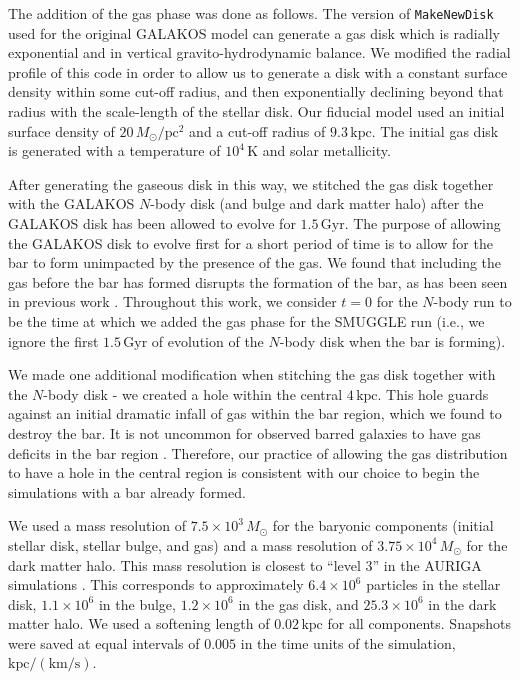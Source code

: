 \documentclass[fleqn,usenatbib]{mnras}
\newcommand{\Nbody}{$N$-body}
\begin{document}
The addition of the gas phase was done as follows. The version of
\texttt{MakeNewDisk} used for the original GALAKOS model can generate a gas disk
which is radially exponential and in vertical gravito-hydrodynamic balance. We
modified the radial profile of this code in order to allow us to generate a disk
with a constant surface density within some cut-off radius, and then
exponentially declining beyond that radius with the scale-length of the stellar
disk. Our fiducial model used an initial surface density of
$20\,M_{\odot}/\textrm{pc}^2$ and a cut-off radius of $9.3\,\textrm{kpc}$. The
initial gas disk is generated with a temperature of $10^4\,\textrm{K}$ and solar
metallicity.

After generating the gaseous disk in this way, we stitched the gas disk together
with the GALAKOS \Nbody{} disk (and bulge and dark matter halo) after the
GALAKOS disk has been allowed to evolve for $1.5\,\textrm{Gyr}$. The purpose of
allowing the GALAKOS disk to evolve first for a short period of time is to allow
for the bar to form unimpacted by the presence of the gas. We found that
including the gas before the bar has formed disrupts the formation of the bar,
as has been seen in previous work \citep[e.g.,][]{2013MNRAS.429.1949A}.
Throughout this work, we consider $t=0$ for the \Nbody{} run to be the time at
which we added the gas phase for the SMUGGLE run (i.e., we ignore the first
$1.5\,\textrm{Gyr}$ of evolution of the \Nbody{} disk when the bar is forming).

We made one additional modification when stitching the gas disk together with
the \Nbody{} disk - we created a hole within the central $4\,\textrm{kpc}$. This
hole guards against an initial dramatic infall of gas within the bar region,
which we found to destroy the bar. It is not uncommon for observed barred
galaxies to have gas deficits in the bar region \citep[though not in the very
center;][]{1993RPPh...56..173S}. Therefore, our practice of allowing the gas
distribution to have a hole in the central region is consistent with our choice
to begin the simulations with a bar already formed.

We used a mass resolution of $7.5\times10^3\,M_{\odot}$ for the baryonic
components (initial stellar disk, stellar bulge, and gas) and a mass resolution
of $3.75\times10^4\,M_{\odot}$ for the dark matter halo. This mass resolution is
closest to ``level 3'' in the AURIGA simulations \citep{2017MNRAS.467..179G}.
This corresponds to approximately $6.4\times10^6$ particles in the stellar disk,
$1.1\times10^6$ in the bulge, $1.2\times10^6$ in the gas disk, and
$25.3\times10^6$ in the dark matter halo. We used a softening length of
$0.02\,\textrm{kpc}$ for all components. Snapshots were saved at equal intervals
of $0.005$ in the time units of the simulation,
$\textrm{kpc}/(\textrm{km}/\textrm{s})$.
\end{document}
